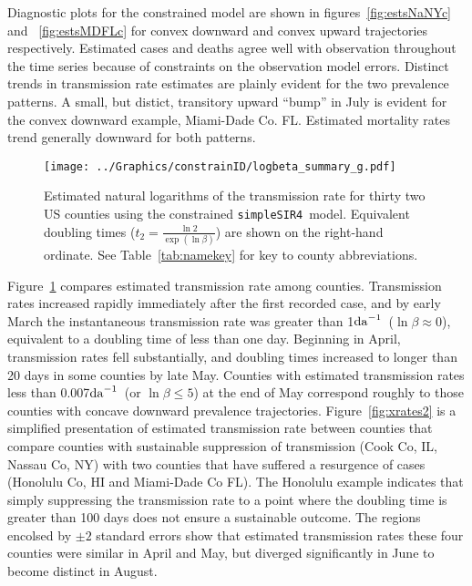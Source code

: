 \documentclass[12pt,letterpaper]{article}
\newcommand\perda{$\rm{da}^{-1}$}
\newcommand\SSm{{\tt simpleSIR4}}
\begin{document}
Diagnostic plots for the constrained model are shown in
figures~\ref{fig:estsNaNYc} and~ \ref{fig:estsMDFLc}
for convex downward and convex upward trajectories
respectively.
Estimated cases and deaths agree well with observation throughout the
time series because of constraints on the observation model errors.
Distinct trends in transmission rate estimates are plainly evident for
the two prevalence patterns. A small, but distict, 
transitory upward ``bump'' in July is
evident for the convex downward example, Miami-Dade Co. FL.
Estimated mortality rates trend generally downward  for both patterns.

\begin{figure}[h!]
\begin{center}
\texttt{[image: ../Graphics/constrainID/logbeta\_summary\_g.pdf]}\\
\end{center}
\caption{\label{fig:xrates}
Estimated natural logarithms of the transmission rate for thirty two US
counties using the constrained \SSm\ model.
Equivalent doubling times ($t_2 = \frac{\ln 2}{\exp(\ln \beta)}$)
are shown on the right-hand ordinate.
See Table~\ref{tab:namekey} for key to county abbreviations.
}
\end{figure}

Figure~\ref{fig:xrates} compares estimated transmission rate among
counties.
Transmission rates increased rapidly immediately after the first
recorded case, and by early March the instantaneous transmission rate was greater
than 1\perda\ ($\ln \beta \approx 0$),
equivalent to a doubling time of less than one day.
Beginning in April, transmission rates fell substantially, and doubling times
increased to longer than 20 days in some counties by late May.
Counties with estimated transmission rates less than 0.007\perda\ 
(or $\ln \beta \le 5$) at the end of May
correspond roughly to those counties with concave downward prevalence
trajectories.
Figure~\ref{fig:xrates2} is a simplified presentation of estimated
transmission rate between counties that compare counties with sustainable
suppression of transmission (Cook Co, IL, Nassau Co, NY) with two counties that
have suffered a resurgence of cases (Honolulu Co, HI and Miami-Dade Co
FL). The Honolulu example indicates that simply suppressing the
transmission rate to a point where the doubling time is greater than
100 days does not ensure a sustainable outcome. The regions encolsed
by $\pm 2$ standard errors show that estimated transmission rates these four counties
were similar in April and May, but diverged significantly in June to
become distinct in August.
\end{document}

